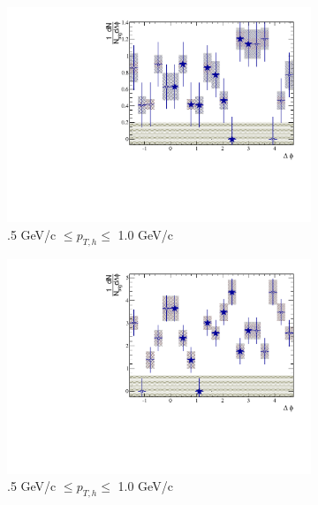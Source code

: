 \begin{figure}[htbp]
	\begin{subfigure}{0.5\textwidth}
		\includegraphics[width=\textwidth]{Plots/Correlations/subtracted/NPE_eh_corr_subtracted_primpt_4_5_cent_7_8_assopt_1_1.pdf}
		\caption{.5 GeV/c $\leq p_{T,h} \leq$ 1.0 GeV/c}
		\label{fig:Sub010a}
	\end{subfigure}	
	\begin{subfigure}{0.5\textwidth}
		\includegraphics[width=\textwidth]{Plots/Correlations/subtracted/NPE_eh_corr_subtracted_primpt_6_8_cent_7_8_assopt_1_1.pdf}
		\caption{.5 GeV/c $\leq p_{T,h} \leq$ 1.0 GeV/c}
		\label{fig:Sub010b}
	\end{subfigure}	
	\begin{subfigure}{0.5\textwidth}

\end{subfigure}
\end{figure}
